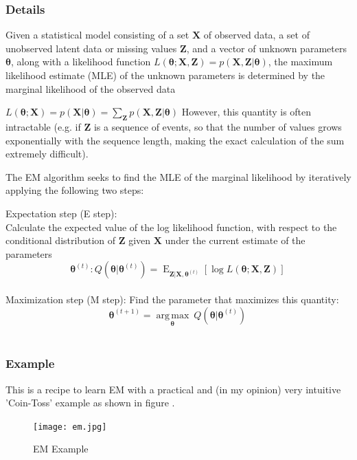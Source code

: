 \documentclass[12pt]{book}
\begin{document}
\subsubsection{Details}
Given a statistical model consisting of a set $\mathbf{X}$ of observed data, a set of unobserved latent data or missing values $\mathbf{Z}$, and a vector of unknown parameters $\boldsymbol\theta$, 
along with a likelihood function $L(\boldsymbol\theta; \mathbf{X}, \mathbf{Z}) = p(\mathbf{X}, \mathbf{Z}|\boldsymbol\theta)$, the maximum likelihood estimate (MLE) of the unknown parameters is 
determined by the marginal likelihood of the observed data

$L(\boldsymbol\theta; \mathbf{X}) = p(\mathbf{X}|\boldsymbol\theta) = \sum_{\mathbf{Z}} p(\mathbf{X},\mathbf{Z}|\boldsymbol\theta)$ 
However, this quantity is often intractable (e.g. if $\mathbf{Z}$ is a sequence of events, so that the number of values grows exponentially with the sequence length, making the exact calculation of 
the sum extremely difficult).

The EM algorithm seeks to find the MLE of the marginal likelihood by iteratively applying the following two steps:

Expectation step (E step): \\
Calculate the expected value of the log likelihood function, with respect to the conditional distribution of $\mathbf{Z}$ given $\mathbf{X}$ under the current estimate of the parameters \\
$$\boldsymbol\theta^{(t)}: Q(\boldsymbol\theta|\boldsymbol\theta^{(t)}) = \operatorname{E}_{\mathbf{Z}|\mathbf{X},\boldsymbol\theta^{(t)}}\left[ \log L (\boldsymbol\theta;\mathbf{X},\mathbf{Z})  \right] \,$$ \\
Maximization step (M step): Find the parameter that maximizes this quantity:\\
$$\boldsymbol\theta^{(t+1)} = \underset{\boldsymbol\theta}{\operatorname{arg\,max}} \ Q(\boldsymbol\theta|\boldsymbol\theta^{(t)}) \,$$\\

\subsubsection{Example}

This is a recipe to learn EM with a practical and (in my opinion) very intuitive 'Coin-Toss' example as shown in figure \cite{blog-em}.
\begin{figure}[H]
\centering
\texttt{[image: em.jpg]}
\caption{EM Example\cite{blog-em}}
\label{fig:figure5}
\end{figure}
\end{document}
